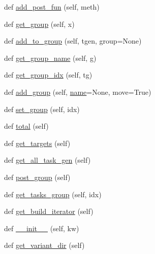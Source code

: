 \begin{DoxyCompactItemize}
\item 
def \hyperlink{classwaflib_1_1_build_1_1_build_context_a64d6fb9f73868bc70922fabaa0682fef}{add\+\_\+post\+\_\+fun} (self, meth)
\item 
def \hyperlink{classwaflib_1_1_build_1_1_build_context_ae9d4d76df236217e6c1ba262df1a7376}{get\+\_\+group} (self, x)
\item 
def \hyperlink{classwaflib_1_1_build_1_1_build_context_a4454ed8386bb714afcd240eedc360720}{add\+\_\+to\+\_\+group} (self, tgen, group=None)
\item 
def \hyperlink{classwaflib_1_1_build_1_1_build_context_a70172b57dd578379f3de337a479d1463}{get\+\_\+group\+\_\+name} (self, g)
\item 
def \hyperlink{classwaflib_1_1_build_1_1_build_context_a8b0e6338acd281989d32dd8a1502e745}{get\+\_\+group\+\_\+idx} (self, tg)
\item 
def \hyperlink{classwaflib_1_1_build_1_1_build_context_a9e1a6200ab3e854ecc9041a5e9abaa78}{add\+\_\+group} (self, \hyperlink{lib_2expat_8h_a1b49b495b59f9e73205b69ad1a2965b0}{name}=None, move=True)
\item 
def \hyperlink{classwaflib_1_1_build_1_1_build_context_a00550c82b40990a204a19c29aee9bfe6}{set\+\_\+group} (self, idx)
\item 
def \hyperlink{classwaflib_1_1_build_1_1_build_context_a9242bac9596041fb6e91bd4f7cdbac51}{total} (self)
\item 
def \hyperlink{classwaflib_1_1_build_1_1_build_context_a11f1e63e72833ad88c0d58ffb29342d6}{get\+\_\+targets} (self)
\item 
def \hyperlink{classwaflib_1_1_build_1_1_build_context_a534cef50b471df8c60a8392209465f7f}{get\+\_\+all\+\_\+task\+\_\+gen} (self)
\item 
def \hyperlink{classwaflib_1_1_build_1_1_build_context_ae2c4605b1c701d8421f922205621f9df}{post\+\_\+group} (self)
\item 
def \hyperlink{classwaflib_1_1_build_1_1_build_context_a24789de45b2753c05b4a972ea7788dda}{get\+\_\+tasks\+\_\+group} (self, idx)
\item 
def \hyperlink{classwaflib_1_1_build_1_1_build_context_a7a7c250dce7990bdebc5d1d58047139a}{get\+\_\+build\+\_\+iterator} (self)
\item 
def \hyperlink{classwaflib_1_1_build_1_1_build_context_a04e1b540edfafc14247ff272cb62e604}{\+\_\+\+\_\+init\+\_\+\+\_\+} (self, kw)
\item 
def \hyperlink{classwaflib_1_1_build_1_1_build_context_acc99340a3386e41dc8d7b6b677db0536}{get\+\_\+variant\+\_\+dir} (self)

\end{DoxyCompactItemize}
